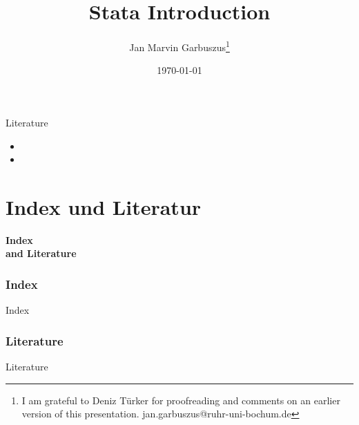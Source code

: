 \documentclass[hyperref={bookmarks=true}, aspectratio=43]{beamer}
\begin{document}
\begin{frame}

  \author[Garbuszus]{Jan Marvin Garbuszus\thanks{I am grateful to Deniz Türker for proofreading and comments on an earlier version of this presentation.\newline
  jan.garbuszus@ruhr-uni-bochum.de}}
  \title{Stata Introduction}
  \date{\today}
  \maketitle
\end{frame}

\begin{frame}{Literature}
\begin{minipage}{11cm}

\begin{itemize}
\item {}
\item {}
\end{itemize}

\end{minipage}
\end{frame}








\part{Index und Literatur}
\begin{frame}
\thispagestyle{empty}
\textbf{\huge{Index \\ and Literature}}
\end{frame}

\section{Index}
\begin{frame}{Index}
\setlength{\columnseprule}{.4pt} 
\begin{multicols}{5}
 \begin{miniscule}
  \printindex
 \end{miniscule}
\end{multicols}
\end{frame}

\section{Literature}
\begin{frame}[allowframebreaks]{Literature}
 \printbibliography[title=none]
\end{frame}
\end{document}
